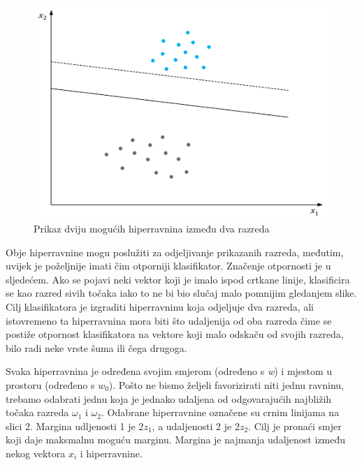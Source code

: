 \documentclass[times, utf8, zavrsni]{fer}
\begin{document}
\begin{figure}[htbp]
\centering
\includegraphics[scale=0.5]{img/linearniklasifikator.png}
\caption{Prikaz  dviju mogućih hiperravnina između dva razreda}
\end{figure}

Obje hiperravnine mogu poslužiti za odjeljivanje prikazanih razreda, međutim, 
uvijek je poželjnije imati čim otporniji klasifikator. Značenje otpornosti je u 
sljedećem. Ako se pojavi neki vektor koji je imalo ispod crtkane linije, 
klasificira se kao razred sivih točaka iako to ne bi bio slučaj malo pomnijim 
gledanjem slike. Cilj klasifikatora je izgraditi hiperravninu koja odjeljuje dva 
razreda, ali istovremeno ta hiperravnina mora biti što udaljenija od oba razreda 
čime se postiže otpornost klasifikatora na vektore koji malo odskaču od svojih razreda, 
bilo radi neke vrste šuma ili čega drugoga. 

Svaka hiperravnina je određena svojim smjerom (određeno s \textit{w}) i mjestom u prostoru (određeno s \(w_0\)). 
Pošto ne bismo željeli favorizirati niti jednu ravninu, trebamo odabrati jednu koja je 
jednako udaljena od odgovarajućih najbližih točaka razreda \(\omega_1\) i \(\omega_2\).  Odabrane hiperravnine 
označene su crnim linijama na slici 2. Margina udljenosti 1 je 2\(z_1\), a udaljenosti 2 je 2\(z_2\). 
Cilj je pronaći smjer koji daje maksmalnu moguću marginu. Margina je najmanja udaljenost 
između nekog vektora \(x_i\) i hiperravnine.
\end{document}
